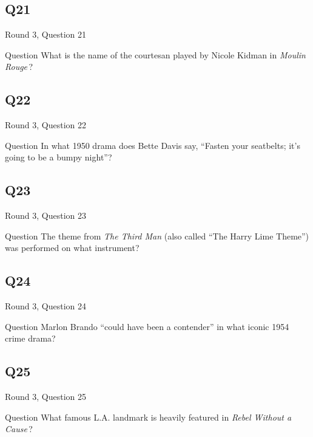 \documentclass[11pt]{beamer}
\begin{document}
\subsection*{Q21}
\begin{frame}[t]{Round 3, Question 21}
  \vspace{2em}
  \begin{block}{Question}
    What is the name of the courtesan played by Nicole Kidman in \emph{Moulin Rouge}\,?
  \end{block}
\end{frame}


\subsection*{Q22}
\begin{frame}[t]{Round 3, Question 22}
  \vspace{2em}
  \begin{block}{Question}
    In what 1950 drama does Bette Davis say, ``Fasten your seatbelts; it's going to be a bumpy night''?
  \end{block}
\end{frame}


\subsection*{Q23}
\begin{frame}[t]{Round 3, Question 23}
  \vspace{2em}
  \begin{block}{Question}
    The theme from \emph{The Third Man} (also called ``The Harry Lime Theme'') was performed on what instrument?
  \end{block}
\end{frame}


\subsection*{Q24}
\begin{frame}[t]{Round 3, Question 24}
  \vspace{2em}
  \begin{block}{Question}
    Marlon Brando ``could have been a contender'' in what iconic 1954 crime drama?
  \end{block}
\end{frame}


\subsection*{Q25}
\begin{frame}[t]{Round 3, Question 25}
  \vspace{2em}
  \begin{block}{Question}
    What famous L.A. landmark is heavily featured in \emph{Rebel Without a Cause}\,?
  \end{block}
\end{frame}
\end{document}

